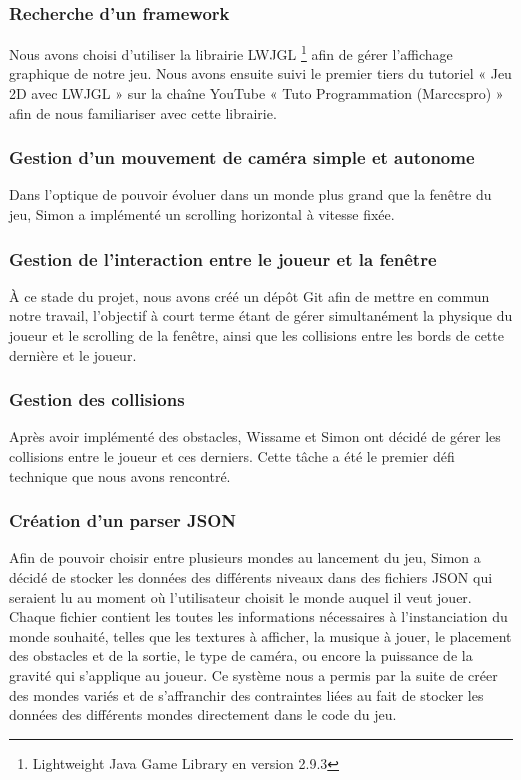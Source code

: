 
\subsubsection{Recherche d'un framework}
Nous avons choisi d'utiliser la librairie LWJGL \footnote{Lightweight Java Game Library en version 2.9.3} afin de gérer l'affichage graphique de notre jeu. Nous avons ensuite suivi le premier tiers du tutoriel « Jeu 2D avec LWJGL » sur la chaîne YouTube « Tuto Programmation (Marccspro) » afin de nous familiariser avec cette librairie.

\subsubsection{Gestion d'un mouvement de caméra simple et autonome}
Dans l'optique de pouvoir évoluer dans un monde plus grand que la fenêtre du jeu, Simon a implémenté un scrolling horizontal à vitesse fixée.

\subsubsection{Gestion de l'interaction entre le joueur et la fenêtre}
À ce stade du projet, nous avons créé un dépôt Git afin de mettre en commun notre travail, l'objectif à court terme étant de gérer simultanément la physique du joueur et le scrolling de la fenêtre, ainsi que les collisions entre les bords de cette dernière et le joueur.

\subsubsection{Gestion des collisions}
Après avoir implémenté des obstacles, Wissame et Simon ont décidé de gérer les collisions entre le joueur et ces derniers. Cette tâche a été le premier défi technique que nous avons rencontré.

\subsubsection{Création d'un parser JSON}
Afin de pouvoir choisir entre plusieurs mondes au lancement du jeu, Simon a décidé de stocker les données des différents niveaux dans des fichiers JSON qui seraient lu au moment où l'utilisateur choisit le monde auquel il veut jouer.
\ml
Chaque fichier contient les toutes les informations nécessaires à l'instanciation du monde souhaité, telles que les textures à afficher, la musique à jouer, le placement des obstacles et de la sortie, le type de caméra, ou encore la puissance de la gravité qui s'applique au joueur.
\ml
Ce système nous a permis par la suite de créer des mondes variés et de s'affranchir des contraintes liées au fait de stocker les données des différents mondes directement dans le code du jeu.

